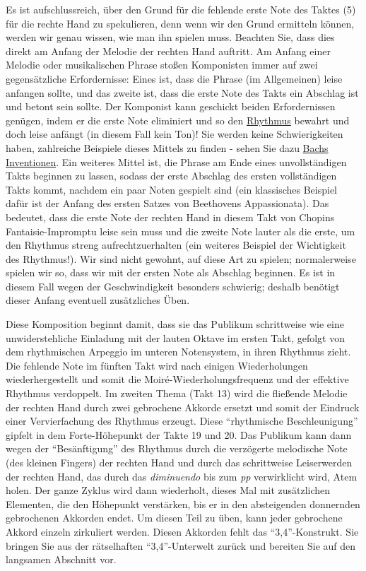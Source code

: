 Es ist aufschlussreich, über den Grund für die fehlende erste Note des Taktes (5) für die rechte Hand zu spekulieren, denn wenn wir den Grund ermitteln können, werden wir genau wissen, wie man ihn spielen muss.
Beachten Sie, dass dies direkt am Anfang der Melodie der rechten Hand auftritt.
Am Anfang einer Melodie oder musikalischen Phrase stoßen Komponisten immer auf zwei gegensätzliche Erfordernisse: Eines ist, dass die Phrase (im Allgemeinen) leise anfangen sollte, und das zweite ist, dass die erste Note des Takts ein Abschlag ist und betont sein sollte.
Der Komponist kann geschickt beiden Erfordernissen genügen, indem er die erste Note eliminiert und so den \hyperref[c1iii1b]{Rhythmus} bewahrt und doch leise anfängt (in diesem Fall kein Ton)!
Sie werden keine Schwierigkeiten haben, zahlreiche Beispiele dieses Mittels zu finden - sehen Sie dazu \hyperref[c1iii20]{Bachs Inventionen}.
Ein weiteres Mittel ist, die Phrase am Ende eines unvollständigen Takts beginnen zu lassen, sodass der erste Abschlag des ersten vollständigen Takts kommt, nachdem ein paar Noten gespielt sind (ein klassisches Beispiel dafür ist der Anfang des ersten Satzes von Beethovens Appassionata).
Das bedeutet, dass die erste Note der rechten Hand in diesem Takt von Chopins Fantaisie-Impromptu leise sein muss und die zweite Note lauter als die erste, um den Rhythmus streng aufrechtzuerhalten (ein weiteres Beispiel der Wichtigkeit des Rhythmus!).
Wir sind nicht gewohnt, auf diese Art zu spielen; normalerweise spielen wir so, dass wir mit der ersten Note als Abschlag beginnen.
Es ist in diesem Fall wegen der Geschwindigkeit besonders schwierig; deshalb benötigt dieser Anfang eventuell zusätzliches Üben.

Diese Komposition beginnt damit, dass sie das Publikum schrittweise wie eine unwiderstehliche Einladung mit der lauten Oktave im ersten Takt, gefolgt von dem rhythmischen Arpeggio im unteren Notensystem, in ihren Rhythmus zieht.
Die fehlende Note im fünften Takt wird nach einigen Wiederholungen wiederhergestellt und somit die Moiré-Wiederholungsfrequenz und der effektive Rhythmus verdoppelt.
Im zweiten Thema (Takt 13) wird die fließende Melodie der rechten Hand durch zwei gebrochene Akkorde ersetzt und somit der Eindruck einer Vervierfachung des Rhythmus erzeugt.
Diese \enquote{rhythmische Beschleunigung} gipfelt in dem Forte-Höhepunkt der Takte 19 und 20.
Das Publikum kann dann wegen der \enquote{Besänftigung} des Rhythmus durch die verzögerte melodische Note (des kleinen Fingers) der rechten Hand und durch das schrittweise Leiserwerden der rechten Hand, das durch das \textit{diminuendo} bis zum \textit{pp} verwirklicht wird, Atem holen.
Der ganze Zyklus wird dann wiederholt, dieses Mal mit zusätzlichen Elementen, die den Höhepunkt verstärken, bis er in den absteigenden donnernden gebrochenen Akkorden endet.
Um diesen Teil zu üben, kann jeder gebrochene Akkord einzeln zirkuliert werden.
Diesen Akkorden fehlt das \enquote{3,4}-Konstrukt. Sie bringen Sie aus der rätselhaften \enquote{3,4}-Unterwelt zurück und bereiten Sie auf den langsamen Abschnitt vor.

